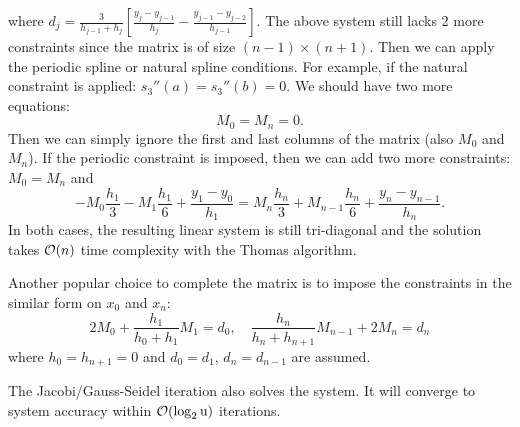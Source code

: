 where $d_j = \frac{3}{h_{j-1} + h_{j}}\left[ \frac{y_{j} - y_{j-1}}{h_{j}} - \frac{y_{j-1} - y_{j-2}}{h_{j-1}}\right]$. 
The above system still lacks 2 more constraints since the matrix is of size $(n-1)\times (n+1)$. Then we can apply the periodic spline or natural spline conditions. For example, if the natural constraint is applied: $s_3''(a) = s_3''(b) = 0$. We should have two more equations: 
\begin{equation}
    M_{0} = M_{n} = 0.
\end{equation} 
Then we can simply ignore the first and last columns of the matrix (also $M_0$ and $M_n$). 
If the periodic constraint is imposed, then we can add two more constraints: $M_0 = M_{n}$ and 
$$-M_0 \frac{h_{1}}{3} - M_1 \frac{h_1}{6} + \frac{y_1 - y_0}{h_1} = M_n \frac{h_n}{3} + M_{n-1} \frac{h_n}{6} + \frac{y_n - y_{n-1}}{h_n}.$$
In both cases, the resulting linear system is still tri-diagonal and the solution takes $\mathcal O(n)$ time complexity with the Thomas algorithm. 

Another popular choice to complete the matrix is to impose the constraints in the similar form on $x_0$ and $x_n$: 
\begin{equation}\label{EQ: EXTENSION}
    2M_0 + \frac{h_1}{h_0 + h_1} M_1 = d_0,\quad  \frac{h_n}{h_{n} + h_{n+1}} M_{n-1} + 2M_n = d_n
\end{equation}
where $h_0 = h_{n+1} = 0$ and $d_0 = d_1$, $d_{n} = d_{n-1}$ are assumed. 
\begin{remark}
The Jacobi/Gauss-Seidel iteration also solves the system. It will converge to system accuracy within $\mathcal O(\log_2 \textup{u})$ iterations.
\end{remark}
